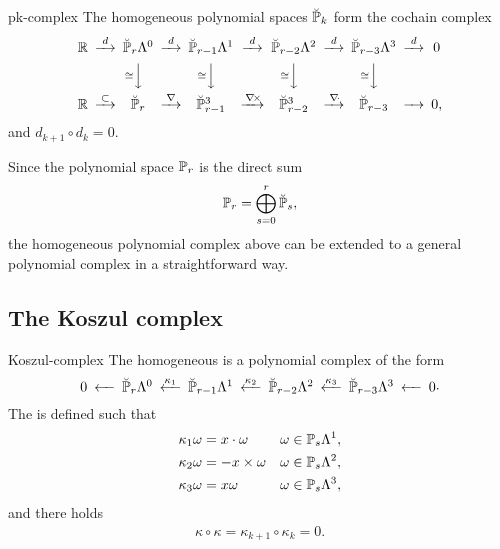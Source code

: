 \begin{Notation}{pk-complex}
  The homogeneous polynomial spaces $\breve\P_k$ form the cochain complex
  \begin{gather}\minCDarrowwidth15pt
    \begin{CD}
      \R
      @>{d}>> \breve\P_r\Lambda^0
      @>{d}>> \breve\P_{r-1}\Lambda^1
      @>{d}>> \breve\P_{r-2}\Lambda^2
      @>{d}>> \breve\P_{r-3}\Lambda^3
      @>{d}>> 0
      \\
      @.
      @V{\cong}VV
      @V{\cong}VV
      @V{\cong}VV
      @V{\cong}VV
      \\
      \R
      @>{\subset}>> \breve\P_r
      @>{\nabla}>> \breve\P_{r-1}^3
      @>{\curl}>> \breve\P_{r-2}^3
      @>{\div}>> \breve\P_{r-3}
      @>>> 0,
    \end{CD}
  \end{gather}
  and $d_{k+1}\circ d_k = 0$.
\end{Notation}

\begin{remark}
  Since the polynomial space $\P_r$ is the direct sum
  \begin{gather*}
    \P_r = \bigoplus_{s=0}^r \breve\P_s,
  \end{gather*}
  the homogeneous polynomial complex above can be extended to a
  general polynomial complex in a straightforward way.
\end{remark}

\subsection{The Koszul complex}

\begin{Definition}{Koszul-complex}
  The homogeneous  is a polynomial complex of
  the form
  \begin{gather}\minCDarrowwidth15pt
    \label{eq:derham:12}
    \begin{CD}
      0
      @<<< \breve \P_r\Lambda^0
      @<{\kappa_1}<< \breve \P_{r-1}\Lambda^1
      @<{\kappa_2}<< \breve \P_{r-2}\Lambda^2
      @<{\kappa_3}<< \breve \P_{r-3}\Lambda^3
      @<<< 0
    \end{CD}.
  \end{gather}
  The  is defined such that
  \begin{gather}
    \label{eq:derham:13}
    \begin{aligned}
      \kappa_1\omega &= x\cdot\omega & \omega&\in \P_s\Lambda^1,\\
      \kappa_2\omega &= -x\times\omega & \omega&\in \P_s\Lambda^2,\\
      \kappa_3\omega &= x\omega & \omega&\in \P_s\Lambda^3,
    \end{aligned}
  \end{gather}
  and there holds
  \begin{gather}
    \label{eq:derham:14}
    \kappa\circ\kappa = \kappa_{k+1}\circ\kappa_k = 0.
  \end{gather}
\end{Definition}

